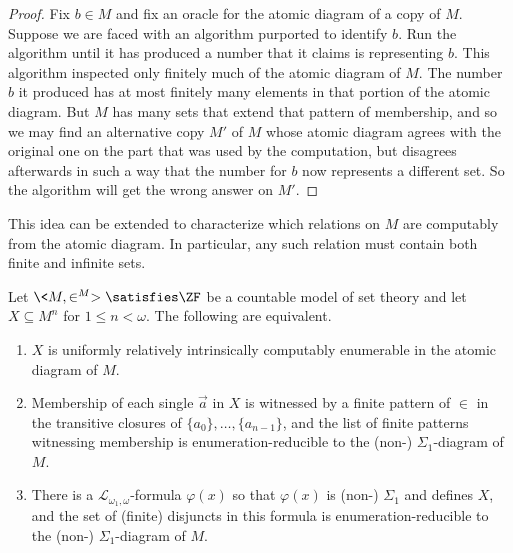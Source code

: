 \documentclass{amsart}
\newcommand{\avec}{\vec{a}}
\begin{document}
 \begin{proof}
 Fix $b\in M$ and fix an oracle for the atomic diagram of a copy of $M$. Suppose we are faced with an algorithm purported to identify $b$. Run the algorithm until it has produced a number that it claims is representing $b$. This algorithm inspected only finitely much of the atomic diagram of $M$. The number $b$ it produced has at most finitely many elements in that portion of the atomic diagram. But $M$ has many sets that extend that pattern of membership, and so we may find an alternative copy $M'$ of $M$ whose atomic diagram agrees with the original one on the part that was used by the computation, but disagrees afterwards in such a way that the number for $b$ now represents a different set. So the algorithm will get the wrong answer on $M'$.
 \end{proof}
 
 This idea can be extended to characterize which relations on $M$ are computably from the atomic diagram. In particular, any such relation must contain both finite and infinite sets.
 
 \begin{theorem}\label{Theorem.Sets-known-by-atomic-diagram}
 Let $\<M,\in^M>\satisfies\ZF$ be a countable model of set theory and let $X \subseteq M^n$ for $1 \le n < \omega$. The following are equivalent.
 \begin{enumerate}
 \item $X$ is uniformly 
 relatively intrinsically computably enumerable in the atomic diagram of $M$.
 \item Membership of each single $\avec$ in $X$ is witnessed by a finite pattern of $\in$ in the transitive closures of $\{a_0\}, \ldots, \{a_{n-1}\}$, and the list of finite patterns witnessing membership is enumeration-reducible
 to the (non-\Levy) $\Sigma_1$-diagram of $M$.
 \item There is a $\mathcal{L}_{\omega_1,\omega}$-formula $\varphi(x)$ so that $\varphi(x)$ is (non-\Levy) $\Sigma_1$ and defines $X$, and the set of (finite) disjuncts in this formula is enumeration-reducible to the (non-\Levy) $\Sigma_1$-diagram of $M$.
 \end{enumerate}
 \end{theorem}
 
\end{document}
